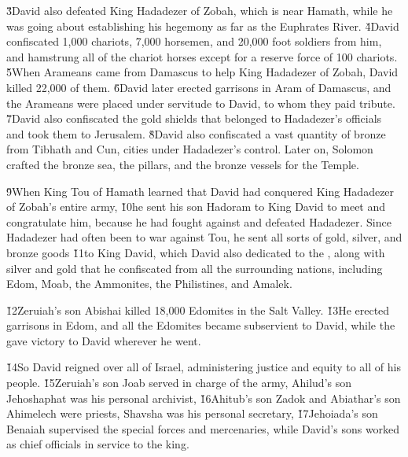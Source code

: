 \v{3}David also defeated King Hadadezer of Zobah, which is near Hamath, while he was going about establishing his hegemony as far as the Euphrates River. \v{4}David confiscated 1,000 chariots, 7,000 horsemen, and 20,000 foot soldiers from him, and hamstrung all of the chariot horses except for a reserve force of 100 chariots. \v{5}When Arameans came from Damascus to help King Hadadezer of Zobah, David killed 22,000 of them. \v{6}David later erected garrisons in Aram of Damascus, and the Arameans were placed under servitude to David, to whom they paid tribute. \v{7}David also confiscated the gold shields that belonged to Hadadezer's officials and took them to Jerusalem. \v{8}David also confiscated a vast quantity of bronze from Tibhath and Cun, cities under Hadadezer's control. Later on, Solomon crafted the bronze sea, the pillars, and the bronze vessels for the Temple.

\v{9}When King Tou of Hamath learned that David had conquered King Hadadezer of Zobah's entire army, \v{10}he sent his son Hadoram to King David to meet and congratulate him, because he had fought against and defeated Hadadezer. Since Hadadezer had often been to war against Tou, he sent all sorts of gold, silver, and bronze goods \v{11}to King David, which David also dedicated to the , along with silver and gold that he confiscated from all the surrounding nations, including Edom, Moab, the Ammonites, the Philistines, and Amalek.

\v{12}Zeruiah's son Abishai killed 18,000 Edomites in the Salt Valley. \v{13}He erected garrisons in Edom, and all the Edomites became subservient to David, while the  gave victory to David wherever he went.

\v{14}So David reigned over all of Israel, administering justice and equity to all of his people. \v{15}Zeruiah's son Joab served in charge of the army, Ahilud's son Jehoshaphat was his personal archivist, \v{16}Ahitub's son Zadok and Abiathar's son Ahimelech were priests, Shavsha was his personal secretary, \v{17}Jehoiada's son Benaiah supervised the special forces and mercenaries, while David's sons worked as chief officials in service to the king.

